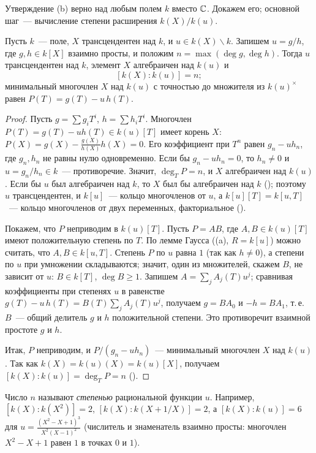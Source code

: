 Утверждение (b) верно над любым полем $k$ вместо $\mathbb C$. Докажем его; основной шаг~--- вычисление степени расширения
$k(X)/k(u)$.

\begin{lemma}[3.1a]
Пусть $k$~--- поле, $X$ трансцендентен над $k$, и $u\in k(X)\smallsetminus k$. Запишем $u=g/h$, где $g,h\in k[X]$ взаимно
просты, и положим $n=\max(\deg g,\deg h)$. Тогда $u$ трансцендентен над $k$, элемент $X$ алгебраичен над $k(u)$ и
\[
[k(X):k(u)]=n;
\]
минимальный многочлен $X$ над $k(u)$ с точностью до множителя из $k(u)^\times$ равен $P(T)=g(T)-u\,h(T)$.
\end{lemma}

\begin{proof}
Пусть $g=\sum g_iT^i$, $h=\sum h_iT^i$. Многочлен $P(T)=g(T)-uh(T)\in k(u)[T]$ имеет корень $X$: $P(X)=g(X)-\frac{g(X)}{h(X)}h(X)=0$.
Его коэффициент при $T^n$ равен $g_n-uh_n$, где $g_n,h_n$ не равны нулю одновременно. Если бы $g_n-uh_n=0$, то $h_n\ne0$ и
$u=g_n/h_n\in k$~--- противоречие. Значит, $\deg_TP=n$, и $X$ алгебраичен над $k(u)$. Если бы $u$ был алгебраичен над
$k$, то $X$ был бы алгебраичен над $k$ (); поэтому $u$ трансцендентен, и $k[u]$~--- кольцо многочленов от $u$,
а $k[u][T]=k[u,T]$~--- кольцо многочленов от двух переменных, факториальное ().

Покажем, что $P$ неприводим в $k(u)[T]$. Пусть $P=AB$, где $A,B\in k(u)[T]$ имеют положительную степень по $T$. По лемме
Гаусса ((a), $R=k[u]$) можно считать, что $A,B\in k[u,T]$. Степень $P$ по $u$ равна $1$ (так как $h\ne0$), а степени
по $u$ при умножении складываются; значит, один из множителей, скажем $B$, не зависит от $u$: $B\in k[T]$, $\deg B\ge1$.
Запишем $A=\sum_jA_j(T)u^j$; сравнивая коэффициенты при степенях $u$ в равенстве $g(T)-u\,h(T)=B(T)\sum_jA_j(T)u^j$,
получаем $g=BA_0$ и $-h=BA_1$, т.\,е.\ $B$~--- общий делитель $g$ и $h$ положительной степени. Это противоречит
взаимной простоте $g$ и $h$.

Итак, $P$ неприводим, и $P/(g_n-uh_n)$~--- минимальный многочлен $X$ над $k(u)$. Так как $k(X)=k(u)(X)=k(u)[X]$, получаем
$[k(X):k(u)]=\deg_TP=n$ ().
\end{proof}

Число $n$ называют \emph{степенью} рациональной функции $u$. Например, $[k(X):k(X^2)]=2$, $[k(X):k(X+1/X)]=2$, а
$[k(X):k(u)]=6$ для $u=\frac{(X^2-X+1)^3}{X^2(X-1)^2}$ (числитель и знаменатель взаимно просты: многочлен $X^2-X+1$
равен $1$ в точках $0$ и $1$).

